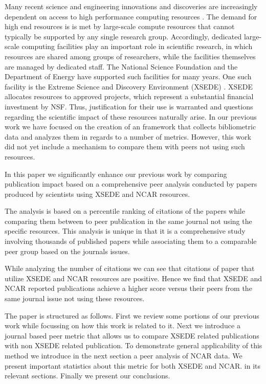 \documentclass{sig-alternate}
\begin{document}
Many recent science and engineering innovations and discoveries are
increasingly dependent on access to high performance computing
resources \cite{las14impact}. The demand for high end resources is is
met by large-scale compute resources that cannot typically be
supported by any single research group. Accordingly, dedicated
large-scale computing facilities play an important role in scientific
research, in which resources are shared among groups of researchers,
while the facilities themselves are managed by dedicated staff. The
National Science Foundation and the Department of Energy have
supported such facilities for many years. One such facility is the
Extreme Science and Discovery Environment (XSEDE) \cite{www-xsede,xsede}.
XSEDE allocates resources to approved projects, which represent a
substantial financial investment by NSF. Thus, justification for their
use is warranted and questions regarding the scientific impact of
these resources naturally arise. In our previous work we have
\cite{las14impact} focused on the creation of an framework that
collects bibliometric data and analyzes them in regards to a number of
metrics. However, this work did not yet include a mechanism to compare
them with peers not using such resources. 

In this paper we significantly enhance our previous work by comparing
publication impact based on a comprehensive peer analysis conducted by
papers produced by scientists using XSEDE and NCAR resources.

The analysis is based on a percentile ranking of citations of the
papers while comparing them between to peer publication in the same
journal not using the specific resources.  This analysis is unique
in that it is a comprehensive study involving thousands of published
papers while associating them to a comparable peer group based on
the journals issues.

While analyzing the number of citations we can see that citations of
paper that utilize XSEDE and NCAR resources are positive.  Hence we
find that XSEDE and NCAR reported publications achieve a higher
score versus their peers from the same journal issue not using these
resources.

The paper is structured as follows. First we review some portions of
our previous work while focussing on how this work is related to it.
Next we introduce a journal based peer metric that allows us to
compare XSEDE related publications with non XSEDE related publication.
To demonstrate general applicability of this method we introduce in
the next section a peer analysis of NCAR data. We present important
statistics about this metric for both XSEDE and NCAR. in its relevant
sections. Finally we present our conclusions.
\end{document}
